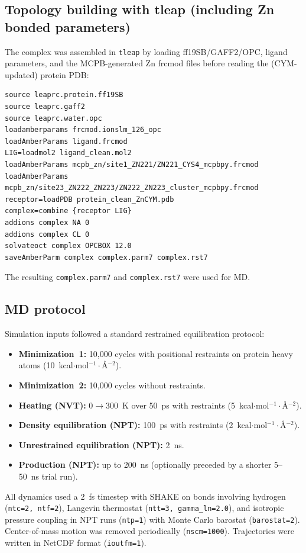 \subsection{Topology building with tleap (including Zn bonded parameters)}
The complex was assembled in \texttt{tleap} by loading ff19SB/GAFF2/OPC, ligand parameters, and the MCPB-generated Zn frcmod files before reading the (CYM-updated) protein PDB:
\begin{verbatim}
source leaprc.protein.ff19SB
source leaprc.gaff2
source leaprc.water.opc
loadamberparams frcmod.ionslm_126_opc
loadAmberParams ligand.frcmod
LIG=loadmol2 ligand_clean.mol2
loadAmberParams mcpb_zn/site1_ZN221/ZN221_CYS4_mcpbpy.frcmod
loadAmberParams mcpb_zn/site23_ZN222_ZN223/ZN222_ZN223_cluster_mcpbpy.frcmod
receptor=loadPDB protein_clean_ZnCYM.pdb
complex=combine {receptor LIG}
addions complex NA 0
addions complex CL 0
solvateoct complex OPCBOX 12.0
saveAmberParm complex complex.parm7 complex.rst7
\end{verbatim}
The resulting \texttt{complex.parm7} and \texttt{complex.rst7} were used for MD.

\subsection{MD protocol}
Simulation inputs followed a standard restrained equilibration protocol:
\begin{itemize}
  \item \textbf{Minimization~1:} 10{,}000 cycles with positional restraints on protein heavy atoms (10~kcal$\cdot$mol$^{-1}\cdot$\AA$^{-2}$).
  \item \textbf{Minimization~2:} 10{,}000 cycles without restraints.
  \item \textbf{Heating (NVT):} 0$\rightarrow$300~K over 50~ps with restraints (5~kcal$\cdot$mol$^{-1}\cdot$\AA$^{-2}$).
  \item \textbf{Density equilibration (NPT):} 100~ps with restraints (2~kcal$\cdot$mol$^{-1}\cdot$\AA$^{-2}$).
  \item \textbf{Unrestrained equilibration (NPT):} 2~ns.
  \item \textbf{Production (NPT):} up to 200~ns (optionally preceded by a shorter 5--50~ns trial run).
\end{itemize}
All dynamics used a 2~fs timestep with SHAKE on bonds involving hydrogen (\texttt{ntc=2, ntf=2}), Langevin thermostat (\texttt{ntt=3, gamma\_ln=2.0}), and isotropic pressure coupling in NPT runs (\texttt{ntp=1}) with Monte Carlo barostat (\texttt{barostat=2}). Center-of-mass motion was removed periodically (\texttt{nscm=1000}). Trajectories were written in NetCDF format (\texttt{ioutfm=1}).

